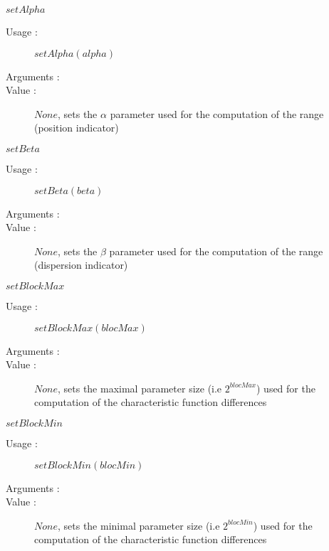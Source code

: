\begin{description}
\begin{description}
  \item $setAlpha$
    \begin{description}
    \item[Usage :]  $setAlpha(alpha)$
    \item[Arguments :]  \strut
    \item[Value :]  $None$, sets the $\alpha$ parameter used for the computation of the range (position indicator)
    \end{description}

  \item $setBeta$
    \begin{description}
    \item[Usage :] $setBeta(beta)$
    \item[Arguments :] \strut
    \item[Value :] $None$, sets the $\beta$ parameter used for the computation of the range (dispersion indicator)
    \end{description}

  \item $setBlockMax$
    \begin{description}
    \item[Usage :]  $setBlockMax(blocMax)$
    \item[Arguments :]  \strut
    \item[Value :] $None$, sets the maximal parameter size (i.e $2^{blocMax}$) used for the computation of the characteristic function differences
    \end{description}

  \item $setBlockMin$
    \begin{description}
    \item[Usage :]  $setBlockMin(blocMin)$
    \item[Arguments :]  \strut
    \item[Value :] $None$, sets the minimal parameter size (i.e $2^{blocMin}$) used for the computation of the characteristic function differences
    \end{description}


\end{description}
\end{description}
